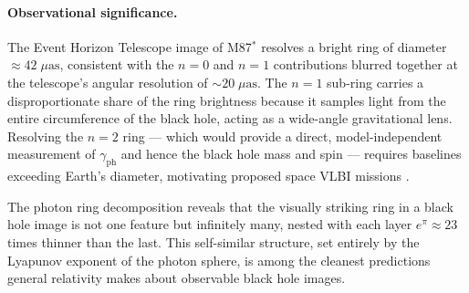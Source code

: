 \paragraph{Observational significance.}

The Event Horizon Telescope image of M87$^*$ resolves a bright ring of
diameter $\approx 42\;\mu\text{as}$, consistent with the $n = 0$ and
$n = 1$ contributions blurred together at the telescope's angular
resolution of $\sim 20\;\mu\text{as}$.  The $n = 1$ sub-ring carries a
disproportionate share of the ring brightness because it samples light
from the entire circumference of the black hole, acting as a
wide-angle gravitational lens.  Resolving the $n = 2$ ring --- which
would provide a direct, model-independent measurement of $\gamma_{\text{ph}}$ and
hence the black hole mass and spin --- requires baselines exceeding
Earth's diameter, motivating proposed space VLBI missions
\cite{Johnson2020}.

The photon ring decomposition reveals that the visually striking ring in
a black hole image is not one feature but infinitely many, nested with
each layer $e^\pi \approx 23$ times thinner than the last.  This
self-similar structure, set entirely by the Lyapunov exponent of the
photon sphere, is among the cleanest predictions general relativity
makes about observable black hole images.
